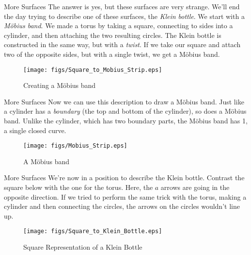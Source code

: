 \documentclass{beamer}
\begin{document}
    \begin{frame}{More Surfaces}
        The answer is yes, but these surfaces are very strange. We'll end the day trying to
        describe one of these surfaces, the \textit{Klein bottle}. We start with a
        \textit{M\"{o}bius band}. We made a torus by taking a square, connecting to sides
        into a cylinder, and then attaching the two resulting circles. The Klein bottle is
        constructed in the same way, but with a \textit{twist}. If we take our square and attach
        two of the opposite sides, but with a single twist, we get a M\"{o}bius band.
        \begin{figure}
            \centering
            \texttt{[image: figs/Square\_to\_Mobius\_Strip.eps]}
            \caption{Creating a M\"{o}bius band}
            \label{fig:square_to_mobius}
        \end{figure}
    \end{frame}
    \begin{frame}{More Surfaces}
        Now we can use this description to draw a M\"{o}bius band.
        Just like a cylinder has a \textit{boundary} (the top and bottom of the cylinder),
        so does a M\"{o}bius band. Unlike the cylinder, which has two boundary parts,
        the M\"{o}bius band has 1, a single closed curve.
        \begin{figure}
            \centering
            \texttt{[image: figs/Mobius\_Strip.eps]}
            \caption{A M\"{o}bius band}
            \label{fig:mobius}
        \end{figure}
    \end{frame}
    \begin{frame}{More Surfaces}
        We're now in a position to describe the Klein bottle.
        Contrast the square below with the one for the torus. Here,
        the $a$ arrows are going in the opposite direction. If we tried
        to perform the same trick with the torus, making a cylinder and then
        connecting the circles, the arrows on the circles wouldn't line up.
        \begin{figure}
            \centering
            \texttt{[image: figs/Square\_to\_Klein\_Bottle.eps]}
            \caption{Square Representation of a Klein Bottle}
            \label{fig:square_klein}
        \end{figure}
    \end{frame}
\end{document}
